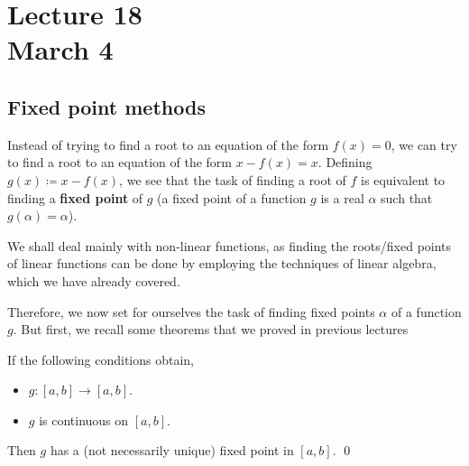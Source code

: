 \chapter*{Lecture 18 \\ March 4}
\setcounter{chapter}{18}
\setcounter{section}{0}

\section{Fixed point methods}

Instead of trying to find a root to an equation of the form $f(x) = 0$, we can try to find a root to an equation of the form $x - f(x) = x$. Defining $g(x) \coloneqq x - f(x)$, we see that the task of finding a root of $f$ is equivalent to finding a \textbf{fixed point} of $g$ (a fixed point of a function $g$ is a real $\alpha$ such that $g(\alpha) = \alpha$).

We shall deal mainly with non-linear functions, as finding the roots/fixed points of linear functions can be done by employing the techniques of linear algebra, which we have already covered.

Therefore, we now set for ourselves the task of finding fixed points $\alpha$ of a function $g$. But first, we recall some theorems that we proved in previous lectures

\begin{thm}
	\label{mar4:thm:efp}
	\hfill

	If the following conditions obtain,
	\begin{itemize}
		\item
		      $g \colon [a, b] \to [a, b]$.

		\item
		      $g$ is continuous on $[a, b]$.

	\end{itemize}
	Then $g$ has a (not necessarily unique) fixed point in $[a, b]$.
	\hfill\qed
\end{thm}

